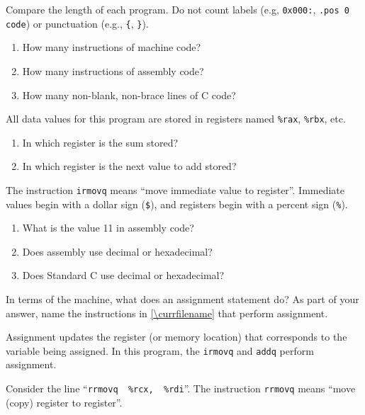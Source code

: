 

\Q Compare the length of each program. Do not count labels (e.g, \verb|0x000:|, \verb|.pos 0 code|) or punctuation (e.g., \verb|{|, \verb|}|).

\begin{enumerate}
\item How many instructions of machine code?  
\item How many instructions of assembly code?  
\item How many non-blank, non-brace lines of C code?  
\end{enumerate}


\Q All data values for this program are stored in registers named \verb|%rax|, \verb|%rbx|, etc.

\begin{enumerate}
\item In which register is the sum stored?  
\item In which register is the next value to add stored?  
\end{enumerate}


\Q The instruction \verb|irmovq| means ``move immediate value to register''. Immediate values begin with a dollar sign (\verb|$|), and registers begin with a percent sign (\verb|%|).

\begin{enumerate}
\item What is the value 11 in assembly code?  
\item Does assembly use decimal or hexadecimal?  
\item Does Standard C use decimal or hexadecimal?  
\end{enumerate}


\Q In terms of the machine, what does an assignment statement do?
As part of your answer, name the instructions in \ref{\currfilename} that perform assignment.

\begin{answer}
Assignment updates the register (or memory location) that corresponds to the variable being assigned.
In this program, the \verb|irmovq| and \verb|addq| perform assignment.
\end{answer}


\Q Consider the line ``\verb|rrmovq  %rcx,  %rdi|''.
The instruction \verb|rrmovq| means ``move (copy) register to register''.

